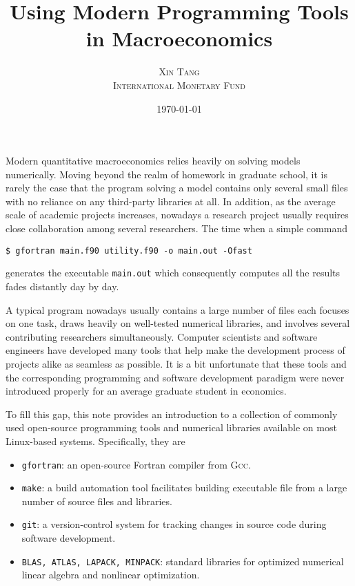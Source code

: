 \documentclass[twoside,11pt,leqno]{article}
\title{\vspace{-1cm}\Large{{\textsf{Using Modern Programming Tools in Macroeconomics}}}}
\author{\normalsize\textsc{Xin Tang} \\ \normalsize\textsc{International Monetary Fund}}
\date{\normalsize\today}
\newcommand{\code}{\texttt}
\begin{document}
\maketitle

Modern quantitative macroeconomics relies heavily on solving models numerically. Moving beyond the realm of homework in graduate school, it is rarely the case that the program solving a model contains only several small files with no reliance on any third-party libraries at all. In addition, as the average scale of academic projects increases, nowadays a research project usually requires close collaboration among several researchers. The time when a simple command
\begin{verbatim}
$ gfortran main.f90 utility.f90 -o main.out -Ofast
\end{verbatim}
generates the executable \code{main.out} which consequently computes all the results fades distantly day by day.

A typical program nowadays usually contains a large number of files each focuses on one task, draws heavily on well-tested numerical libraries, and involves several contributing researchers simultaneously. Computer scientists and software engineers have developed many tools that help make the development process of projects alike as seamless as possible. It is a bit unfortunate that these tools and the corresponding programming and software development paradigm were never introduced properly for an average graduate student in economics.

To fill this gap, this note provides an introduction to a collection of commonly used open-source programming tools and numerical libraries available on most Linux-based systems. Specifically, they are
\begin{itemize}
    \item
    \code{gfortran}: an open-source Fortran compiler from \textsc{Gcc}.
    \item
    \code{make}: a build automation tool facilitates building executable file from a large number of source files and libraries.
    \item
    \code{git}: a version-control system for tracking changes in source code during software development.
    \item
    \code{BLAS, ATLAS, LAPACK, MINPACK}: standard libraries for optimized numerical linear algebra and nonlinear optimization.
\end{itemize}
\end{document}
